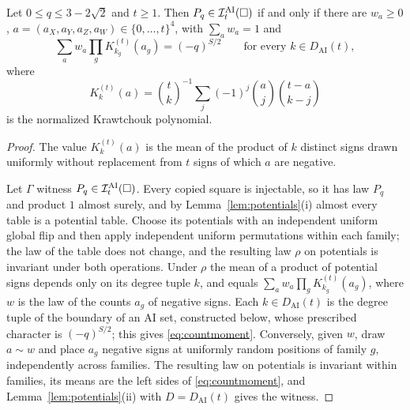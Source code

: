 \begin{lemma}\label{lem:countmoment}
Let $0\le q\le3-2\sqrt2$ and $t\ge1$. Then $P_q\in\mathcal I^{\mathrm{AI}}_t(\square)$ if and only if there are $w_a\ge0$, $a=(a_X,a_Y,a_Z,a_W)\in\{0,\dots,t\}^4$, with $\sum_aw_a=1$ and
\begin{equation}\label{eq:countmoment}
\sum_aw_a\prod_{g}K^{(t)}_{k_g}(a_g)=(-q)^{S/2}\qquad\text{for every }k\in D_{\mathrm{AI}}(t),
\end{equation}
where
\[
K^{(t)}_k(a)=\binom tk^{-1}\sum_j(-1)^j\binom aj\binom{t-a}{k-j}
\]
is the normalized Krawtchouk polynomial.
\end{lemma}

\begin{proof}
The value $K^{(t)}_k(a)$ is the mean of the product of $k$ distinct signs drawn uniformly without replacement from $t$ signs of which $a$ are negative.

Let $\Gamma$ witness $P_q\in\mathcal I^{\mathrm{AI}}_t(\square)$. Every copied square is injectable, so it has law $P_q$ and product $1$ almost surely, and by Lemma~\ref{lem:potentials}(i) almost every table is a potential table. Choose its potentials with an independent uniform global flip and then apply independent uniform permutations within each family; the law of the table does not change, and the resulting law $\rho$ on potentials is invariant under both operations. Under $\rho$ the mean of a product of potential signs depends only on its degree tuple $k$, and equals $\sum_aw_a\prod_gK^{(t)}_{k_g}(a_g)$, where $w$ is the law of the counts $a_g$ of negative signs. Each $k\in D_{\mathrm{AI}}(t)$ is the degree tuple of the boundary of an AI set, constructed below, whose prescribed character is $(-q)^{S/2}$; this gives \eqref{eq:countmoment}. Conversely, given $w$, draw $a\sim w$ and place $a_g$ negative signs at uniformly random positions of family $g$, independently across families. The resulting law on potentials is invariant within families, its means are the left sides of \eqref{eq:countmoment}, and Lemma~\ref{lem:potentials}(ii) with $D=D_{\mathrm{AI}}(t)$ gives the witness.


\end{proof}
